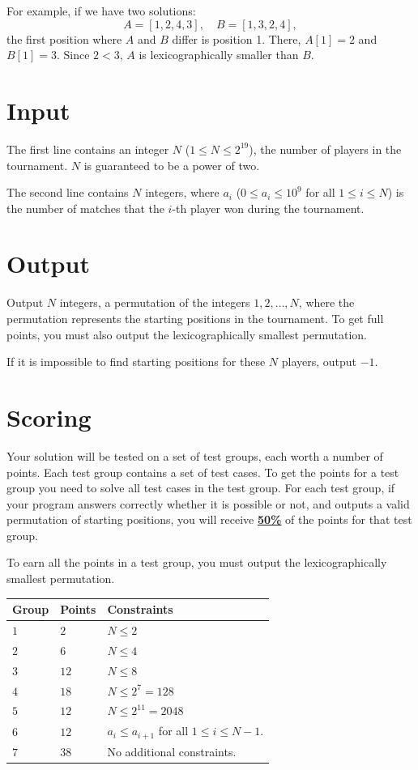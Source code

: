 For example, if we have two solutions:  
$$
A = [1, 2, 4, 3], \quad B = [1, 3, 2, 4],  
$$  
the first position where $A$ and $B$ differ is position 1. There, $A[1] = 2$ and $B[1] = 3$. Since $2 < 3$, $A$ is
lexicographically smaller than $B$.  


\section*{Input}
The first line contains an integer $N$ ($1 \leq N \leq 2^{19}$), the number of players in the tournament. $N$ is
guaranteed to be a power of two.

The second line contains $N$ integers, where $a_i$ ($0 \leq a_i \leq 10^9$ for all $1 \leq i \leq N$) is the number
of matches that the $i$-th player won during the tournament.

\section*{Output}
Output $N$ integers, a permutation of the integers $1, 2, \ldots, N$, where the permutation represents the starting
positions in the tournament. To get full points, you must also output the lexicographically smallest permutation.

If it is impossible to find starting positions for these $N$ players, output $-1$.

\section*{Scoring}
Your solution will be tested on a set of test groups, each worth a number of points. Each test group contains
a set of test cases. To get the points for a test group you need to solve all test cases in the test group.
For each test group, if your program answers correctly whether it is possible or not,  
and outputs a valid permutation of starting positions, you will receive \underline{\textbf{50\%}} of the points for
that test group.

To earn all the points in a test group, you must output the lexicographically smallest permutation.

\noindent
\begin{tabular}{| l | l | p{12cm} |}
  \hline
  \textbf{Group} & \textbf{Points} & \textbf{Constraints} \\ \hline
  $1$    & $2$        & $N \leq 2$ \\ \hline
  $2$    & $6$        & $N \leq 4$ \\ \hline
  $3$    & $12$       & $N \leq 8$ \\ \hline
  $4$    & $18$       & $N \leq 2^7 = 128$ \\ \hline
  $5$    & $12$       & $N \leq 2^{11} = 2048$ \\ \hline
  $6$    & $12$       & $a_i \leq a_{i+1}$ for all $1 \leq i \leq N-1$. \\ \hline 
  $7$    & $38$       & No additional constraints. \\ \hline %
\end{tabular}


